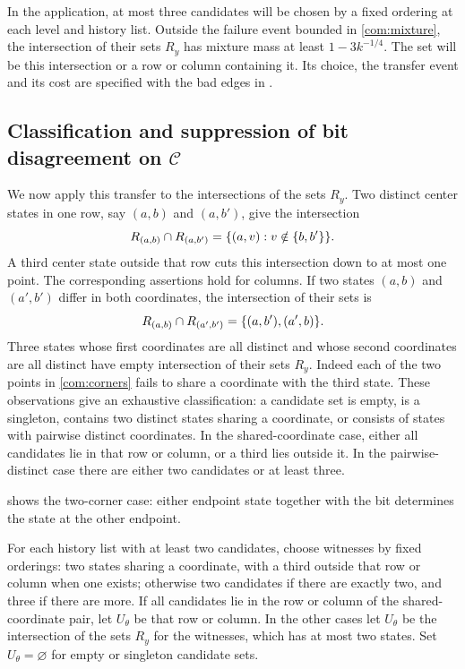 In the application, at most three candidates will be chosen by a fixed
ordering at each level and history list. Outside the failure event bounded in
\eqref{com:mixture}, the intersection of their sets \(R_y\) has mixture mass at
least \(1-3k^{-1/4}\). The set will be this intersection or a row or
column containing it. Its choice, the transfer event and its cost are
specified with the bad edges in .

\subsection{\texorpdfstring{Classification and suppression of bit disagreement on $\mathcal C$}{Classification and suppression of bit disagreement on C}}\label{sec:common-variation-proof}

We now apply this transfer to the intersections of the sets \(R_y\). Two
distinct center states in one row, say \((a,b)\) and \((a,b')\), give the intersection
\begin{equation}\label{com:row-intersection}
 R_{(a,b)}\cap R_{(a,b')}
       =\{(a,v):v\notin\{b,b'\}\}.
\end{equation}
A third center state outside that row cuts this intersection down to at most
one point. The corresponding assertions hold for columns. If two states
\((a,b)\) and \((a',b')\) differ in both coordinates, the intersection of their sets is
\begin{equation}\label{com:corners}
 R_{(a,b)}\cap R_{(a',b')}
       =\{(a,b'),(a',b)\}.
\end{equation}
Three states whose first coordinates are all distinct and whose second
coordinates are all distinct have empty intersection of their sets \(R_y\). Indeed each of the
two points in \eqref{com:corners} fails to share a coordinate with the third
state. These observations give an exhaustive classification: a candidate
set is empty, is a singleton, contains two distinct states sharing a
coordinate, or consists of states with pairwise distinct coordinates.
In the shared-coordinate case, either all candidates lie in that row or
column, or a third lies outside it. In the pairwise-distinct case there
are either two candidates or at least three.

 shows the two-corner case: either endpoint state
together with the bit determines the state at the other endpoint.


For each history list with at least two candidates, choose witnesses by fixed
orderings: two states sharing a coordinate, with a third outside that row
or column when one exists; otherwise two candidates if there are exactly
two, and three if there are more. If all candidates lie in the row or
column of the shared-coordinate pair, let \(U_\theta\) be that row or
column. In the other cases let \(U_\theta\) be the intersection of the sets \(R_y\) for the witnesses, which has at most two states. Set \(U_\theta=\varnothing\)
for empty or singleton candidate sets.

